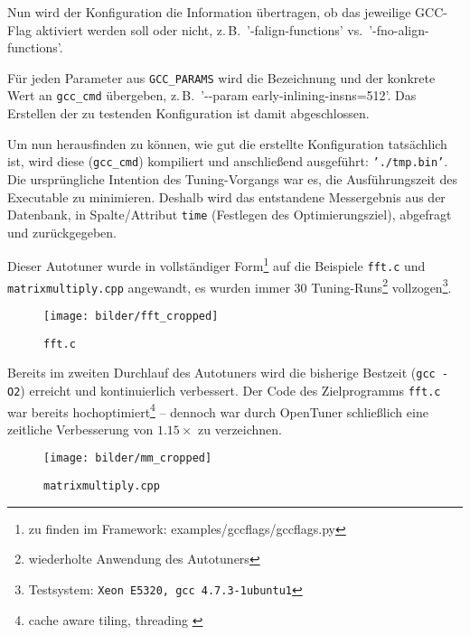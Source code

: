 \documentclass[a4paper,11pt]{scrartcl}
\newcommand{\zB}{\mbox{z.\,B.}\xspace}
\newcommand{\vs}{\mbox{vs.}\xspace}
\begin{document}

Nun wird der Konfiguration die Information übertragen, ob das jeweilige GCC-Flag
aktiviert werden soll oder nicht, \zB~'-falign-functions' \vs~'-fno-align-functions'.


Für jeden Parameter aus \texttt{GCC\_PARAMS} wird die Bezeichnung und der
konkrete Wert an \texttt{gcc\_cmd} übergeben, \zB~'-{}-param early-inlining-insns=512'.
Das Erstellen der zu testenden Konfiguration ist damit abgeschlossen. \newline


Um nun herausfinden zu können, wie gut die erstellte Konfiguration tatsächlich ist, 
wird diese (\texttt{gcc\_cmd}) kompiliert und anschließend ausgeführt: \texttt{'./tmp.bin'}.
Die ursprüngliche Intention des Tuning-Vorgangs war es, die Ausführungszeit des 
Executable zu minimieren. Deshalb wird das entstandene Messergebnis aus der Datenbank,
in Spalte/Attribut \texttt{time} (Festlegen des Optimierungsziel), abgefragt und zurückgegeben. \newline

Dieser Autotuner wurde in vollständiger Form\footnote{zu finden im Framework: 
examples/gccflags/gccflags.py} auf die Beispiele \texttt{fft.c} 
und \texttt{matrixmultiply.cpp} angewandt, es wurden immer 30 Tuning-Runs\footnote{wiederholte Anwendung 
des Autotuners} vollzogen\footnote{Testsystem: \texttt{Xeon E5320, gcc 4.7.3-1ubuntu1}}.

\begin{figure}[h]
\begin{center}
\texttt{[image: bilder/fft\_cropped]}
\cite{OT-paper} \caption{\texttt{fft.c}}
\end{center}
\end{figure}

Bereits im zweiten Durchlauf des Autotuners wird die bisherige Bestzeit (\texttt{gcc -O2}) 
erreicht und kontinuierlich verbessert. Der Code des Zielprogramms \texttt{fft.c} war bereits
hochoptimiert\footnote{cache aware tiling, threading \cite[S.~6]{OT-paper}} 
-- dennoch war durch OpenTuner schließlich eine zeitliche Verbesserung von $1.15 \times$  zu verzeichnen.

\begin{figure}[h]
\begin{center}
\texttt{[image: bilder/mm\_cropped]}
\cite{OT-paper} \caption{\texttt{matrixmultiply.cpp}}
\end{center}
\end{figure}
\end{document}
